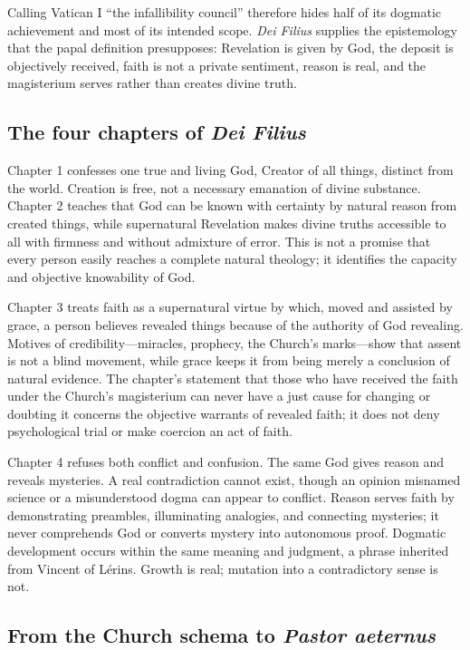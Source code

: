 Calling Vatican I “the infallibility council” therefore hides half of its dogmatic achievement and most of its intended scope. \emph{Dei Filius} supplies the epistemology that the papal definition presupposes: Revelation is given by God, the deposit is objectively received, faith is not a private sentiment, reason is real, and the magisterium serves rather than creates divine truth.

\subsection{The four chapters of \emph{Dei Filius}}

Chapter 1 confesses one true and living God, Creator of all things, distinct from the world. Creation is free, not a necessary emanation of divine substance. Chapter 2 teaches that God can be known with certainty by natural reason from created things, while supernatural Revelation makes divine truths accessible to all with firmness and without admixture of error. This is not a promise that every person easily reaches a complete natural theology; it identifies the capacity and objective knowability of God.

Chapter 3 treats faith as a supernatural virtue by which, moved and assisted by grace, a person believes revealed things because of the authority of God revealing. Motives of credibility—miracles, prophecy, the Church's marks—show that assent is not a blind movement, while grace keeps it from being merely a conclusion of natural evidence. The chapter's statement that those who have received the faith under the Church's magisterium can never have a just cause for changing or doubting it concerns the objective warrants of revealed faith; it does not deny psychological trial or make coercion an act of faith.

Chapter 4 refuses both conflict and confusion. The same God gives reason and reveals mysteries. A real contradiction cannot exist, though an opinion misnamed science or a misunderstood dogma can appear to conflict. Reason serves faith by demonstrating preambles, illuminating analogies, and connecting mysteries; it never comprehends God or converts mystery into autonomous proof. Dogmatic development occurs within the same meaning and judgment, a phrase inherited from Vincent of Lérins. Growth is real; mutation into a contradictory sense is not.

\subsection{From the Church schema to \emph{Pastor aeternus}}

